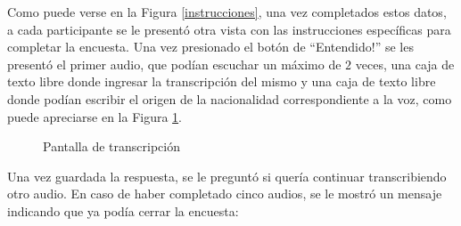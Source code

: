 Como puede verse en la Figura \ref{instrucciones}, una vez completados estos datos, a cada participante se le presentó otra vista con las instrucciones específicas para completar la encuesta. Una vez presionado el botón de ``Entendido!'' se les presentó el primer audio, que podían escuchar un máximo de $2$ veces, una caja de texto libre donde ingresar la transcripción del mismo y una caja de texto libre donde podían escribir el origen de la nacionalidad correspondiente a la voz, como puede apreciarse en la Figura \ref{transcripcion}.

\begin{figure}
\begin{center}
\end{center}
\caption{Pantalla de transcripción}
\label{transcripcion}
\end{figure}

Una vez guardada la respuesta, se le preguntó si quería continuar transcribiendo otro audio. En caso de haber completado cinco audios, se le mostró un mensaje indicando que ya podía cerrar la encuesta:

\begin{center}
\end{center}
